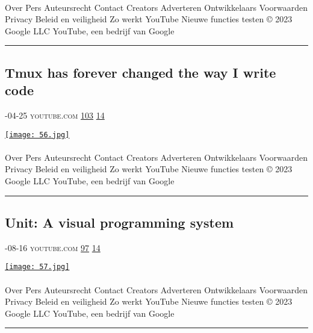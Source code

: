 \documentclass[10pt,a4paper]{article}
\begin{document}
\begin{multicols*}{2}
\paragraph{}
Over
Pers
Auteursrecht
Contact
Creators
Adverteren
Ontwikkelaars
Voorwaarden
Privacy
Beleid en veiligheid
Zo werkt YouTube
Nieuwe functies testen
© 2023 Google LLC
YouTube, een bedrijf van Google
\par\noindent\textcolor{red}{\rule{\linewidth}{0.2mm}}
\vfill
\null
\noindent\begin{minipage}{\linewidth}
\subsection{Tmux has forever changed the way I write code}
\textsc{\footnotesize
{\scriptsize\faCalendar}-04-25 
{\scriptsize\faYoutube}\space 
youtube.com 
{\scriptsize\faThumbsOUp}\space 
\href{http://news.ycombinator.com/item?id=37172711\&utm\_term=comment}{103} 
{\scriptsize\faComments}\space 
\href{http://news.ycombinator.com/item?id=37172711\&utm\_term=comment}{14} 
}
\par\medskip\noindent
\href{https://www.youtube.com/watch?v=DzNmUNvnB04\&utm\_source=hackernewsletter\&utm\_medium=email\&utm\_term=watching}{
    \texttt{[image: 56.jpg]}
}
\end{minipage}
\paragraph{}
Over
Pers
Auteursrecht
Contact
Creators
Adverteren
Ontwikkelaars
Voorwaarden
Privacy
Beleid en veiligheid
Zo werkt YouTube
Nieuwe functies testen
© 2023 Google LLC
YouTube, een bedrijf van Google
\par\noindent\textcolor{red}{\rule{\linewidth}{0.2mm}}
\vfill
\null
\noindent\begin{minipage}{\linewidth}
\subsection{Unit: A visual programming system}
\textsc{\footnotesize
{\scriptsize\faCalendar}-08-16 
{\scriptsize\faYoutube}\space 
youtube.com 
{\scriptsize\faThumbsOUp}\space 
\href{http://news.ycombinator.com/item?id=37156337\&utm\_term=comment}{97} 
{\scriptsize\faComments}\space 
\href{http://news.ycombinator.com/item?id=37156337\&utm\_term=comment}{14} 
}
\par\medskip\noindent
\href{https://www.youtube.com/watch?v=lvvzolKHt2E\&utm\_source=hackernewsletter\&utm\_medium=email\&utm\_term=watching}{
    \texttt{[image: 57.jpg]}
}
\end{minipage}
\paragraph{}
Over
Pers
Auteursrecht
Contact
Creators
Adverteren
Ontwikkelaars
Voorwaarden
Privacy
Beleid en veiligheid
Zo werkt YouTube
Nieuwe functies testen
© 2023 Google LLC
YouTube, een bedrijf van Google
\par\noindent\textcolor{red}{\rule{\linewidth}{0.2mm}}
\vfill
\null
\end{multicols*}
\end{document}

